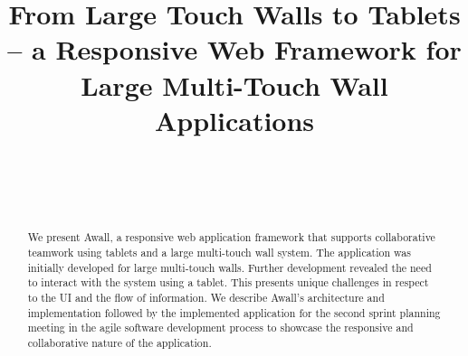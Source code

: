 \documentclass{sigchi}
\begin{document}
\title{From Large Touch Walls to Tablets -- a Responsive Web Framework for Large Multi-Touch Wall Applications}

\author{%
  \\
  \\
  \\
}

\maketitle




\begin{abstract}
We present Awall, a responsive web application framework that supports collaborative teamwork using tablets and a large multi-touch wall system. 
The application was initially developed for large multi-touch walls. 
Further development revealed the need to interact with the system using a tablet. 
This presents unique challenges in respect to the UI and the flow of information. 
We describe Awall's architecture and implementation followed by the implemented application for the second sprint planning meeting in the agile software development process to showcase the responsive and collaborative nature of the application.
\end{abstract}

\end{document}
